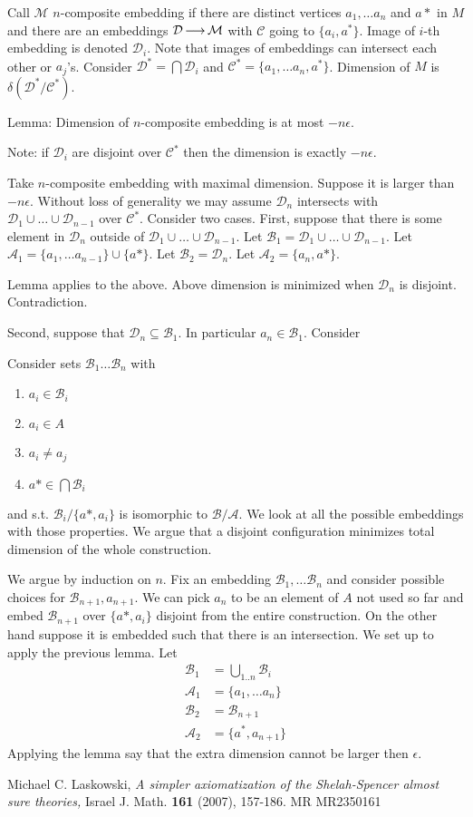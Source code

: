 \documentclass{amsart}
\newcommand{\A}{\mathcal A}
\newcommand{\B}{\mathcal B}
\renewcommand{\C}{\mathcal C}
\newcommand{\D}{\mathcal D}
\newcommand{\M}{\mathcal M}
\begin{document}
Call $\M$ $n$-composite embedding if there are distinct vertices $a_1, \ldots a_n$ and $a*$ in $M$ and there are an embeddings $\D \arr \M$ with $\C$ going to $\{a_i, a^*\}$. Image of $i$-th embedding is denoted $\D_i$. Note that images of embeddings can intersect each other or $a_j$'s. Consider $\D^* = \bigcap \D_i$ and $\C^* = \{a_1, \ldots a_n, a^*\}$. Dimension of $M$ is $\delta(\D^*/\C^*)$.

Lemma: Dimension of $n$-composite embedding is at most $-n\epsilon$.

Note: if $\D_i$ are disjoint over $\C^*$ then the dimension is exactly $-n\epsilon$.

Take $n$-composite embedding with maximal dimension. Suppose it is larger than $-n\epsilon$.
Without loss of generality we may assume $\D_n$ intersects with $\D_1 \cup \ldots \cup \D_{n-1}$ over $\C^*$.
Consider two cases.
First, suppose that there is some element in $\D_n$ outside of $\D_1 \cup \ldots \cup \D_{n-1}$.
Let $\B_1 = \D_1 \cup \ldots \cup \D_{n-1}$.
Let $\A_1 = \{a_1, \ldots a_{n-1}\} \cup \{a*\}$.
Let $\B_2 = \D_n$.
Let $\A_2 = \{a_n, a*\}$.

Lemma applies to the above. Above dimension is minimized when $\D_n$ is disjoint. Contradiction.

Second, suppose that $\D_n \subseteq \B_1$. In particular $a_n \in \B_1$. Consider

Consider sets $\B_1 \ldots \B_n$ with 
\begin{enumerate}
	\item $a_i \in \B_i$
	\item $a_i \in A$
	\item $a_i \neq a_j$
	\item $a* \in \bigcap \B_i$
\end{enumerate}
 and  s.t. $\B_i / \{a*, a_i\}$ is isomorphic to $\B/\A$. We look at all the possible embeddings with those properties. We argue that a disjoint configuration minimizes total dimension of the whole construction.

We argue by induction on $n$. Fix an embedding $\B_1, \ldots \B_n$ and consider possible choices for $\B_{n+1}, a_{n+1}$. We can pick $a_n$ to be an element of $A$ not used so far and embed $\B_{n+1}$ over $\{a*, a_i\}$ disjoint from the entire construction. On the other hand suppose it is embedded such that there is an intersection. We set up to apply the previous lemma. Let
\begin{align*}
	\B_1 &= \bigcup_{1..n} \B_i \\
	\A_1 &= \{a_1, \ldots a_n\} \\
	\B_2 &= \B_{n+1} \\
	\A_2 &= \{a^*, a_{n+1}\}
\end{align*}
Applying the lemma say that the extra dimension cannot be larger then $\epsilon$.

\begin{thebibliography}{9}

	Michael C. Laskowski, \textsl{A simpler axiomatization of the Shelah-Spencer almost sure theories,}
	Israel J. Math. \textbf{161} (2007), 157-186. MR MR2350161

\end{thebibliography}
\end{document}
